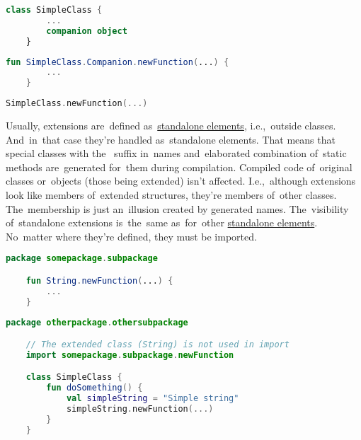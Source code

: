 \begin{lstlisting}[language=Kotlin, title={Class with a~companion object without a~body}]
    class SimpleClass {
        ...
        companion object
    }
\end{lstlisting}
\begin{lstlisting}[language=Kotlin, title={Companion object extension definition}]
    fun SimpleClass.Companion.newFunction(...) {
        ...
    }
\end{lstlisting}
\begin{lstlisting}[language=Kotlin, title={Usage}]
    SimpleClass.newFunction(...)
\end{lstlisting}

\label{kotlinextensionscope}
Usually, extensions are~defined as~\hyperref[kotlinstandalone]{standalone elements}, i.e.,~outside classes.
And~in~that case they're handled as~standalone elements.
That means that special classes with the~ suffix in~names and~elaborated combination of~static methods are~generated for~them during compilation.
Compiled code of~original classes or~objects (those being extended) isn't affected.
I.e.,~although extensions look like members of~extended structures, they're members of~other classes.
The~membership is just an~illusion created by generated names.
The~visibility of~standalone extensions is~the~same as~for~other \hyperref[kotlinstandalone]{standalone elements}.
No~matter where they're defined, they must be imported.
\newline

\begin{lstlisting}[language=Kotlin, title={Extension definition}]
    package somepackage.subpackage

    fun String.newFunction(...) {
        ...
    }
\end{lstlisting}
\newline

\begin{lstlisting}[language=Kotlin, title={Usage in a class}]
    package otherpackage.othersubpackage

    // The extended class (String) is not used in import
    import somepackage.subpackage.newFunction

    class SimpleClass {
        fun doSomething() {
            val simpleString = "Simple string"
            simpleString.newFunction(...)
        }
    }
\end{lstlisting}
\newline
\newline

